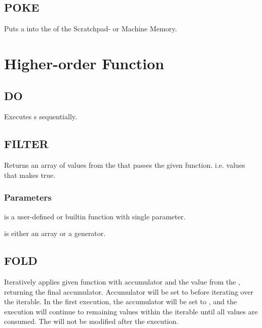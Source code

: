     \subsection{POKE}
        \par
        Puts a  into the  of the Scratchpad- or Machine Memory.

\section{Higher-order Function}

    \subsection{DO}
        \par
        Executes s sequentially.
    \subsection{FILTER}
        \par
        Returns an array of values from the  that passes the given function. i.e. values that makes  true.
        \subsubsection*{Parameters}
        \begin{itemlist}
        \item {} is a user-defined or builtin function with single parameter.
        \item {} is either an array or a generator.
        \end{itemlist}
    \subsection{FOLD}
        \par
        Iteratively applies given function with accumulator and the value from the , returning the final accumulator. Accumulator will be set to  before iterating over the iterable. In the first execution, the accumulator will be set to , and the execution will continue to remaining values within the iterable until all values are consumed. The  will not be modified after the execution.
